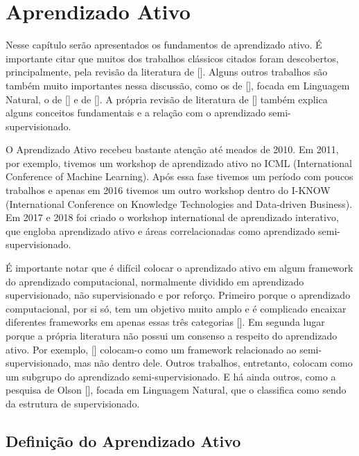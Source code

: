 \chapter{Aprendizado Ativo}
\label{cap:aprendizado_ativo}

Nesse capítulo serão apresentados os fundamentos de aprendizado ativo. É importante citar que muitos dos trabalhos clássicos citados foram descobertos, principalmente, pela revisão da literatura de [\cite{settles2012active, settles2014active}]. Alguns outros trabalhos são também muito importantes nessa discussão, como os de [\cite{olsson2009literature}], focada em Linguagem Natural, o de [\cite{aggarwal2014active}] e de [\cite{wang2011active}]. A própria revisão de literatura de [\cite{zhu2006semi}] também explica alguns conceitos fundamentais e a relação com o aprendizado semi-supervisionado.

O Aprendizado Ativo recebeu bastante atenção até meados de 2010. Em 2011, por exemplo, tivemos um workshop de aprendizado ativo no ICML (International Conference of Machine Learning). Após essa fase tivemos um período com poucos trabalhos e apenas em 2016 tivemos um outro workshop dentro do I-KNOW (International Conference on Knowledge Technologies and Data-driven Business). Em 2017 e 2018 foi criado o workshop international de aprendizado interativo, que engloba aprendizado ativo e áreas correlacionadas como aprendizado semi-supervisionado.

É importante notar que é difícil colocar o aprendizado ativo em algum framework do aprendizado computacional, normalmente dividido em aprendizado supervisionado, não supervisionado  e por reforço. Primeiro porque o aprendizado computacional, por si só, tem um objetivo muito amplo e é complicado encaixar diferentes frameworks em apenas essas três categorias [\cite{abu2012learning}]. Em segunda lugar porque a própria literatura não possui um consenso a respeito do aprendizado ativo. Por exemplo, [\cite{settles2012active, zhu2006semi}] colocam-o como um framework relacionado ao semi-supervisionado, mas não dentro dele. Outros trabalhos, entretanto, colocam como um subgrupo do aprendizado semi-supervisionado. E há ainda outros, como a pesquisa de Olson [\cite{olsson2009literature}], focada em Linguagem Natural, que o classifica como sendo da estrutura de supervisionado. 

\section{Definição do Aprendizado Ativo}
\label{sec:definicao}

